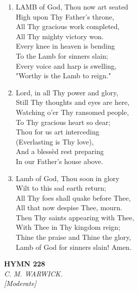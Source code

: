 \documentclass[11pt,a4paper]{article}
\begin{document}
\begin{enumerate}
    \item LAMB of God, Thou now art seated \\
            High upon Thy Father's throne, \\
        All Thy gracious work completed, \\
            All Thy mighty victory won. \\
        Every knee in heaven is bending \\
            To the Lamb for sinners slain; \\
        Every voice and harp is swelling, \\
            "Worthy is the Lamb to reign."

    \item Lord, in all Thy power and glory, \\
            Still Thy thoughts and eyes are here, \\
        Watching o'er Thy ransomed people, \\
            To Thy gracious heart so dear; \\
        Thou for us art interceding \\
            (Everlasting is Thy love), \\
        And a bless\`ed rest preparing \\
            In our Father's house above.

    \item Lamb of God, Thou soon in glory \\
            Wilt to this sad earth return; \\
        All Thy foes shall quake before Thee, \\
            All that now despise Thee, mourn. \\
        Then Thy saints appearing with Thee, \\
            With Thee in Thy kingdom reign; \\
        Thine the praise and Thine the glory, \\
            Lamb of God for sinners slain! Amen.

\end{enumerate}

\newpage
\begin{center}
    {\Large \textbf{HYMN 228}}
    \\
    \textit{C. M. WARWICK.}
    \\
    \textit{\small [Moderate]}
\end{center}
\vspace{1em}
\end{document}
